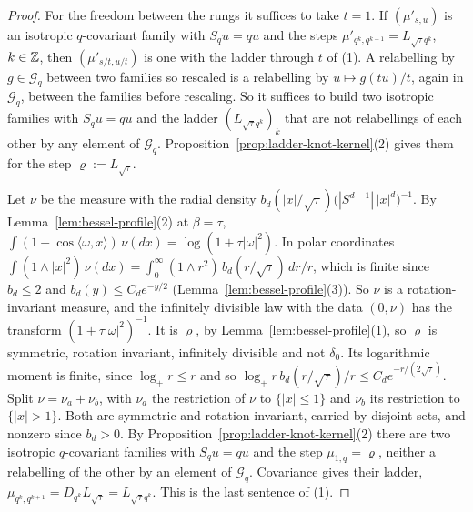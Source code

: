 \begin{proof}
For the freedom between the rungs it suffices to take $t = 1$. If $(\mu'_{s,u})$ is an isotropic
$q$-covariant family with $S_qu = qu$ and the steps $\mu'_{q^k,q^{k+1}} = L_{\sqrt\tau q^k}$,
$k \in \mathbb{Z}$, then $(\mu'_{s/t,u/t})$ is one with the ladder through $t$ of (1). A relabelling by
$g \in \mathcal{G}_q$ between two families so rescaled is a relabelling by
$u \mapsto g(tu)/t$, again in $\mathcal{G}_q$, between the families before rescaling. So it
suffices to build two isotropic families with $S_qu = qu$ and the ladder $(L_{\sqrt\tau q^k})_k$
that are not relabellings of each other by any element of $\mathcal{G}_q$.
Proposition~\ref{prop:ladder-knot-kernel}(2) gives them for the step $\varrho := L_{\sqrt\tau}$.

Let $\nu$ be the measure with the radial density
$b_d(|x|/\sqrt\tau)\bigl(|S^{d-1}|\,|x|^d\bigr)^{-1}$. By Lemma~\ref{lem:bessel-profile}(2) at
$\beta = \tau$, $\int(1 - \cos\langle\omega, x\rangle)\,\nu(dx) = \log(1 + \tau|\omega|^2)$.
In polar coordinates $\int(1 \wedge |x|^2)\,\nu(dx) = \int_0^\infty(1 \wedge r^2)\,b_d(r/\sqrt\tau)\,dr/r$,
which is finite since $b_d \le 2$ and $b_d(y) \le C_de^{-y/2}$ (Lemma~\ref{lem:bessel-profile}(3)).
So $\nu$ is a rotation-invariant \Levy{} measure, and the infinitely divisible law with the data
$(0, \nu)$ has the transform $(1 + \tau|\omega|^2)^{-1}$. It is $\varrho$, by
Lemma~\ref{lem:bessel-profile}(1), so $\varrho$ is symmetric, rotation invariant, infinitely
divisible and not $\delta_0$. Its logarithmic moment is finite, since $\log_+ r \le r$ and so
$\log_+ r\,b_d(r/\sqrt\tau)/r \le C_d e^{-r/(2\sqrt\tau)}$. Split $\nu = \nu_a + \nu_b$, with
$\nu_a$ the restriction of $\nu$ to $\{|x| \le 1\}$ and $\nu_b$ its restriction to $\{|x| > 1\}$.
Both are symmetric and rotation invariant, carried by disjoint sets, and nonzero since $b_d > 0$.
By Proposition~\ref{prop:ladder-knot-kernel}(2) there are two isotropic $q$-covariant families
with $S_qu = qu$ and the step $\mu_{1,q} = \varrho$, neither a relabelling of the other by an
element of $\mathcal{G}_q$. Covariance gives their ladder,
$\mu_{q^k,q^{k+1}} = D_{q^k}L_{\sqrt\tau} = L_{\sqrt\tau q^k}$. This is the last sentence of (1).


\end{proof}
